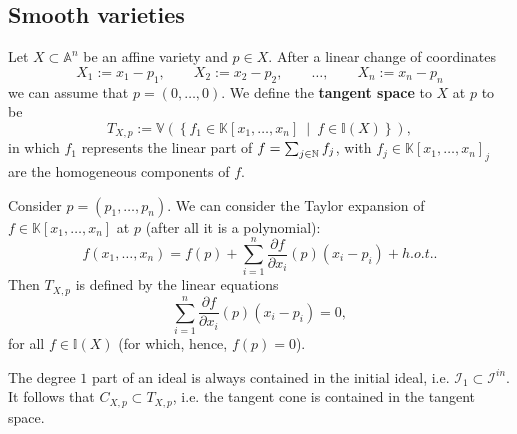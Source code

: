 \subsection{Smooth varieties}
\begin{defn}
	Let $X \subset \mathbb{A}^{n}$ be an affine variety and $p \in X$.
	After a linear change of coordinates
	\begin{equation}
	X_1 := x_1 - p_1, \qquad X_2 := x_2 - p_2, \qquad \ldots, \qquad
	X_n := x_n - p_n
	\end{equation} 
	we can assume that $p = \left( 0, \ldots, 0 \right)$.
	We define the \textbf{tangent space} to $X$ at $p$ to be
	\begin{equation}
	T_{X,p} := \mathbb{V}\left( \left\{ f_1 \in \mathbb{K}\left[x_1, \ldots, x_n \right] \ \middle|\ 
	f \in \mathbb{I}(X)\right\} \right)
	,\end{equation} 
	in which $f_1$ represents the linear part of $f = \sum_{j \in \mathbb{N}}^{} f_j$, with
	$f_j \in \mathbb{K}\left[x_1, \ldots, x_n \right]_j$ are the homogeneous components of $f$.
\end{defn}

\begin{rem}[]
	Consider $p = \left( p_1, \ldots, p_n \right)$.
	We can consider the Taylor expansion of $f \in \mathbb{K}\left[x_1, \ldots, x_n \right]$ at $p$
	(after all it is a polynomial):
	\begin{equation}
		f \left( x_1, \ldots, x_n \right) =
		f(p) + \sum_{i=1}^{n} \frac{\partial f}{\partial x_i} (p) \left( x_i - p_i \right) +
		h.o.t.
	.\end{equation} 
	Then $T_{X,p}$ is defined by the linear equations
	\begin{equation}
		\sum_{i=1}^{n} \frac{\partial f}{\partial x_i} (p) \left( x_i - p_i \right) = 0
	,\end{equation} 
	for all $f \in \mathbb{I}(X)$ (for which, hence, $f(p) = 0$).
\end{rem}

\begin{rem}[]
	The degree $1$ part of an ideal is always contained in the initial ideal,
	i.e. $\mathcal{I}_1 \subset \mathcal{I}^{in}$.
	It follows that $C_{X,p} \subset T_{X, p}$, i.e. the tangent cone is contained in the tangent space.
\end{rem}
 
